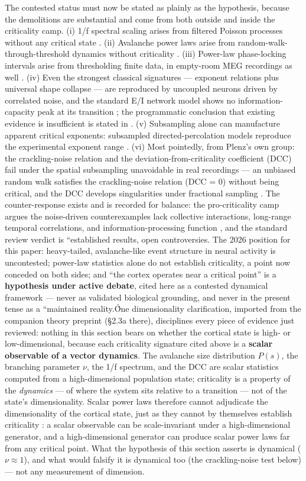 \documentclass[
]{article}
\begin{document}
The contested status must now be stated as plainly as the hypothesis,
because the demolitions are substantial and come from both outside and
inside the criticality camp. (i) 1/f spectral scaling arises from
filtered Poisson processes without any critical state . (ii) Avalanche
power laws arise from random-walk-through-threshold dynamics without
criticality . (iii) Power-law phase-locking intervals arise from
thresholding finite data, in empty-room MEG recordings as well . (iv)
Even the strongest classical signatures --- exponent relations plus
universal shape collapse --- are reproduced by uncoupled neurons driven
by correlated noise, and the standard E/I network model shows no
information-capacity peak at its transition ; the programmatic
conclusion that existing evidence is insufficient is stated in . (v)
Subsampling alone can manufacture apparent critical exponents:
subsampled directed-percolation models reproduce the experimental
exponent range . (vi) Most pointedly, from Plenz's own group: the
crackling-noise relation and the deviation-from-criticality coefficient
(DCC) fail under the spatial subsampling unavoidable in real recordings
--- an unbiased random walk satisfies the crackling-noise relation (DCC
= 0) without being critical, and the DCC develops singularities under
fractional sampling . The counter-response exists and is recorded for
balance: the pro-criticality camp argues the noise-driven
counterexamples lack collective interactions, long-range temporal
correlations, and information-processing function , and the standard
review verdict is ``established results, open controversies. The 2026
position for this paper: heavy-tailed, avalanche-like event structure in
neural activity is uncontested; power-law statistics alone do not
establish criticality, a point now conceded on both sides; and ``the
cortex operates near a critical point'' is a \textbf{hypothesis under
active debate}, cited here as a contested dynamical framework --- never
as validated biological grounding, and never in the present tense as a
``maintained reality.Ó́ne dimensionality clarification, imported from the
companion theory preprint (§2.3a there), disciplines every piece of
evidence just reviewed: nothing in this section bears on whether the
cortical state is high- or low-dimensional, because each criticality
signature cited above is a \textbf{scalar observable of a vector
dynamics}. The avalanche size distribution \(P(s)\), the branching
parameter \(\nu\), the 1/f spectrum, and the DCC are scalar statistics
computed from a high-dimensional population state; criticality is a
property of the \emph{dynamics} --- of where the system sits relative to
a transition --- not of the state's dimensionality. Scalar power laws
therefore cannot adjudicate the dimensionality of the cortical state,
just as they cannot by themselves establish criticality : a scalar
observable can be scale-invariant under a high-dimensional generator,
and a high-dimensional generator can produce scalar power laws far from
any critical point. What the hypothesis of this section asserts is
dynamical (\(\nu \approx 1\)), and what would falsify it is dynamical
too (the crackling-noise test below) --- not any measurement of
dimension.
\end{document}
